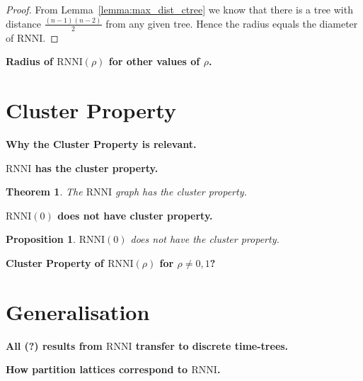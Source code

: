 \documentclass[11pt]{amsart}
\newtheorem{proposition}{Proposition}
\newtheorem{theorem}{Theorem}
\newcommand{\rnni}{\mathrm{RNNI}}
\newcommand{\summary}[1]{\textbf{#1}} %
\begin{document}
\begin{proof}
	From Lemma~\ref{lemma:max_dist_ctree} we know that there is a tree with distance $\frac{(n-1)(n-2)}{2}$ from any given tree.
	Hence the radius equals the diameter of $\rnni$.
\end{proof}

\summary{Radius of $\rnni(\rho)$ for other values of $\rho$.}


\section{Cluster Property}

\summary{Why the Cluster Property is relevant.}

\summary{$\rnni$ has the cluster property.}
\begin{theorem}
	The $\rnni$ graph has the cluster property.
\end{theorem}

\summary{$\rnni(0)$ does not have cluster property.}
\begin{proposition}
	$\rnni(0)$ does not have the cluster property.
\end{proposition}

\summary{Cluster Property of $\rnni(\rho)$ for $\rho \neq 0, 1$?}


\section{Generalisation}

\summary{All (?) results from $\rnni$ transfer to discrete time-trees.}

\summary{How partition lattices correspond to $\rnni$.}
\end{document}
